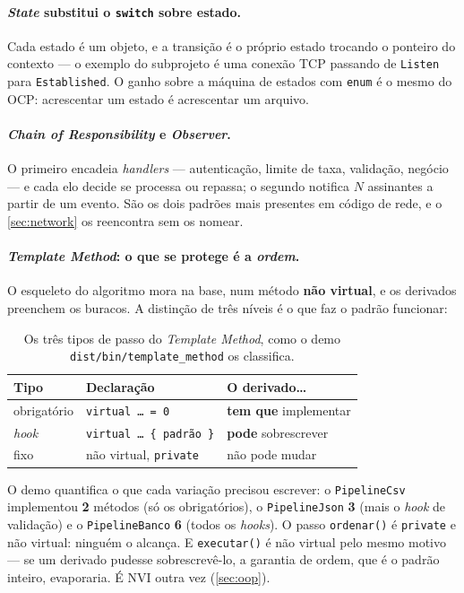 \paragraph{\emph{State} substitui o \texttt{switch} sobre estado.} Cada estado é
um objeto, e a transição é o próprio estado trocando o ponteiro do contexto ---
o exemplo do subprojeto é uma conexão TCP passando de \texttt{Listen} para
\texttt{Established}. O ganho sobre a máquina de estados com \texttt{enum} é o
mesmo do OCP: acrescentar um estado é acrescentar um arquivo.

\paragraph{\emph{Chain of Responsibility} e \emph{Observer}.} O primeiro
encadeia \emph{handlers} --- autenticação, limite de taxa, validação, negócio
--- e cada elo decide se processa ou repassa; o segundo notifica $N$ assinantes
a partir de um evento. São os dois padrões mais presentes em código de rede, e o
\cref{sec:network} os reencontra sem os nomear.

\paragraph{\emph{Template Method}: o que se protege é a \emph{ordem}.} O
esqueleto do algoritmo mora na base, num método \textbf{não virtual}, e os
derivados preenchem os buracos. A distinção de três níveis é o que faz o padrão
funcionar:

\begin{table}[htbp]
\centering
\caption{Os três tipos de passo do \emph{Template Method}, como o demo
         \texttt{dist/bin/template\_method} os classifica.}
\label{tab:template-method}
\footnotesize
\begin{tabular}{@{}lll@{}}
\toprule
\textbf{Tipo} & \textbf{Declaração} & \textbf{O derivado\ldots} \\
\midrule
obrigatório & \texttt{virtual \ldots{} = 0}        & \textbf{tem que} implementar \\
\emph{hook} & \texttt{virtual \ldots{} \{ padrão \}} & \textbf{pode} sobrescrever \\
fixo        & não virtual, \texttt{private}        & não pode mudar \\
\bottomrule
\end{tabular}
\end{table}

O demo quantifica o que cada variação precisou escrever: o
\texttt{PipelineCsv} implementou \textbf{2} métodos (só os obrigatórios), o
\texttt{PipelineJson} \textbf{3} (mais o \emph{hook} de validação) e o
\texttt{PipelineBanco} \textbf{6} (todos os \emph{hooks}). O passo
\texttt{ordenar()} é \texttt{private} e não virtual: ninguém o alcança. E
\texttt{executar()} é não virtual pelo mesmo motivo --- se um derivado pudesse
sobrescrevê-lo, a garantia de ordem, que é o padrão inteiro, evaporaria. É NVI
outra vez (\cref{sec:oop}).

